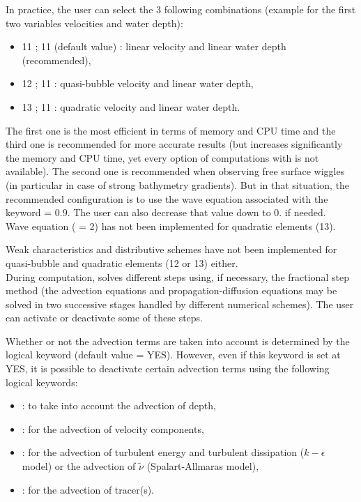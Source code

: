 In practice, the user can select the 3 following combinations
(example for the first two variables velocities and water depth):

\begin{itemize}
\item 11 ; 11 (default value) : linear velocity and linear water depth
(recommended),

\item 12 ; 11 : quasi-bubble velocity and linear water depth,

\item 13 ; 11 : quadratic velocity and linear water depth.
\end{itemize}

The first one is the most efficient in terms of memory and CPU time
and the third one is recommended for more accurate results
(but increases significantly the memory and CPU time,
yet every option of computations with  is not available).
The second one is recommended when observing free surface wiggles
(in particular in case of strong bathymetry gradients).
But in that situation, the recommended configuration is to use the wave equation
associated with the keyword  = 0.9.
The user can also decrease that value down to 0. if needed.\\

Wave equation ( = 2) has not been
implemented for quadratic elements (13).

Weak characteristics and distributive schemes have not been implemented
for quasi-bubble and quadratic elements (12 or 13) either.\\

During computation,  solves different steps using, if necessary,
the fractional step method (the advection equations and propagation-diffusion
equations may be solved in two successive stages handled by different numerical
schemes).
The user can activate or deactivate some of these steps.

Whether or not the advection terms are taken into account is determined
by the logical keyword  (default value = YES).
However, even if this keyword is set at YES, it is possible
to deactivate certain advection terms using the following logical keywords:

\begin{itemize}
\item {}: to take into account the advection of depth,

\item {}: for the advection of velocity components,

\item {}: for the advection of turbulent energy
and turbulent dissipation ($k-\epsilon$ model)
or the advection of $\tilde{\nu}$ (Spalart-Allmaras model),

\item {}: for the advection of tracer(s).
\end{itemize}

